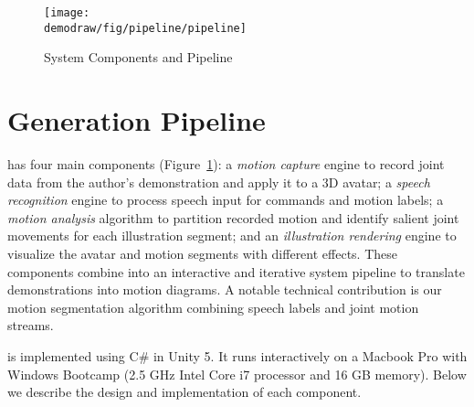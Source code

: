 
\begin{figure}[t]
  \centering
  \texttt{[image: \\demodraw/fig/pipeline/pipeline]}
  \caption{\systemname{} System Components and Pipeline}
  \label{fig:pipeline}
\end{figure}

\section{Generation Pipeline}


\systemname{} has four main components (Figure~\ref{fig:pipeline}):
%
a \emph{motion capture} engine to record joint data from the author's demonstration and apply it to a 3D avatar;
%
a \emph{speech recognition} engine to process speech input for commands and motion labels;
%
a \emph{motion analysis} algorithm to partition recorded motion and identify salient joint movements for each illustration segment;
%
and an \emph{illustration rendering} engine to visualize the avatar and motion segments with different effects.
%
These components combine into an interactive and iterative system pipeline to translate demonstrations into motion diagrams.
A notable technical contribution is our motion segmentation algorithm combining speech labels and joint motion streams.

%
\systemname{} is implemented using C\# in Unity 5. %
It runs interactively on a Macbook Pro with Windows Bootcamp (2.5 GHz Intel Core i7 processor and 16 GB memory).
%
Below we describe the design and implementation of each component.

